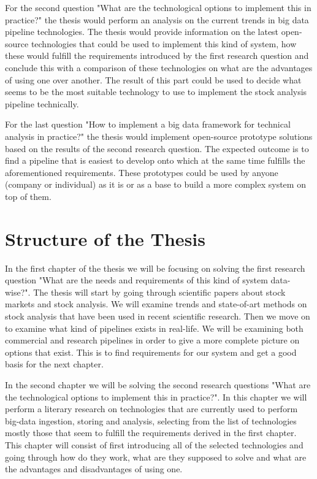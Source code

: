 For the second question "What are the technological options to implement this in practice?" the thesis would perform an analysis on the current trends in big data pipeline technologies.
The thesis would provide information on the latest open-source technologies that could be used to implement this kind of system, how these would fulfill the requirements introduced by the first research question and conclude this with a comparison of these technologies on what are the advantages of using one over another.
The result of this part could be used to decide what seems to be the most suitable technology to use to implement the stock analysis pipeline technically.

For the last question "How to implement a big data framework for technical analysis in practice?" the thesis would implement open-source prototype solutions based on the results of the second research question.
The expected outcome is to find a pipeline that is easiest to develop onto which at the same time fulfills the aforementioned requirements.
These prototypes could be used by anyone (company or individual) as it is or as a base to build a more complex system on top of them.

\section{Structure of the Thesis}

In the first chapter of the thesis we will be focusing on solving the first research question "What are the needs and requirements of this kind of system data-wise?".
The thesis will start by going through scientific papers about stock markets and stock analysis.
We will examine trends and state-of-art methods on stock analysis that have been used in recent scientific research.
Then we move on to examine what kind of pipelines exists in real-life.
We will be examining both commercial and research pipelines in order to give a more complete picture on options that exist.
This is to find requirements for our system and get a good basis for the next chapter.

In the second chapter we will be solving the second research questions "What are the technological options to implement this in practice?".
In this chapter we will perform a literary research on technologies that are currently used to perform big-data ingestion, storing and analysis, selecting from the list of technologies mostly those that seem to fulfill the requirements derived in the first chapter.
This chapter will consist of first introducing all of the selected technologies and going through how do they work, what are they supposed to solve and what are the advantages and disadvantages of using one.

